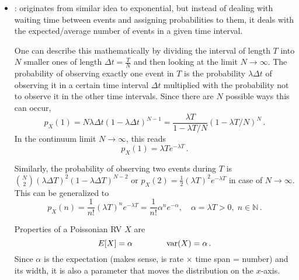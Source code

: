 \begin{ex}
\begin{itemize}


\item {}: originates from similar idea to exponential, but instead of dealing with waiting time between events and assigning probabilities to them, it deals with the expected/average number of events in a given time interval.

One can describe this mathematically by dividing the interval of length $T$ into $N$ smaller ones of length $\Delta t = \frac{T}{N}$ and then looking at the limit $N \rightarrow \infty$. The probability of observing exactly one event in $T$ is the probability $\lambda \Delta t$ of observing it in a certain time interval $\Delta t$ multiplied with the probability not to observe it in the other time intervals. Since there are $N$ possible ways this can occur,
\begin{equation*}
p_X(1) = N \lambda \Delta t (1 - \lambda \Delta t)^{N - 1} = \frac{\lambda T}{1 - \lambda T/ N} (1 - \lambda T/ N)^N \, .
\end{equation*}
In the continuum limit $N \rightarrow \infty$, this reads
\begin{equation*}
p_X(1) = \lambda T e^{- \lambda T} \, .
\end{equation*}

Similarly, the probability of observing two events during $T$ is $\binom{N}{2} (\lambda \Delta T)^2 (1 - \lambda \Delta T)^{N - 2}$ or $p_X(2) = \frac{1}{2} (\lambda T)^2 e^{- \lambda T}$ in case of $N \rightarrow \infty$. This can be generalized to
\begin{equation}
p_X(n) = \frac{1}{n!} (\lambda T)^n e^{- \lambda T} = \frac{1}{n!} \alpha^n e^{- \alpha}, \quad \alpha = \lambda T > 0, \; n \in \mathbb{N} \, .
\end{equation}



Properties of a Poissonian RV $X$ are
\begin{equation}
E[X] = \alpha \qquad \qquad \operatorname{var}(X) = \alpha \, .
\end{equation}
Since $\alpha$ is the expectation (makes sense, is rate $\times$ time span = number) and its width, it is also a parameter that moves the distribution on the $x$-axis.%



\end{itemize}
\end{ex}
